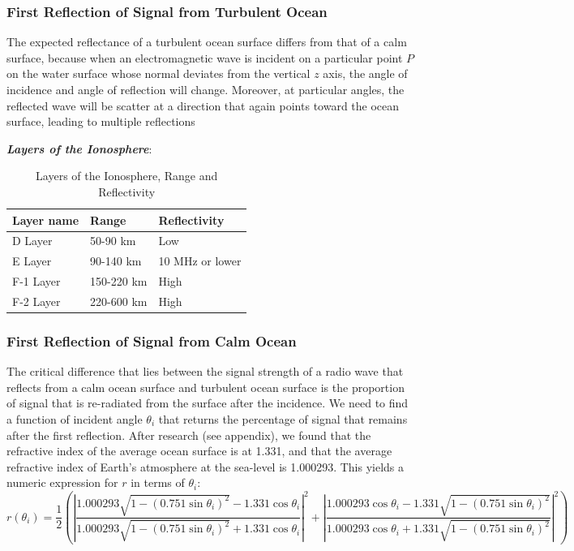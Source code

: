 \documentclass{article}
\begin{document}
\subsubsection{First Reflection of Signal from Turbulent Ocean}

The expected reflectance of a turbulent ocean surface differs from that of a calm surface, because when an electromagnetic wave is incident on a particular point $P$ on the water surface whose normal deviates from the vertical $z$ axis, the angle of incidence and angle of reflection will change. Moreover, at particular angles, the reflected wave will be scatter at a direction that again points toward the ocean surface, leading to multiple reflections 

\textbf{\textit{Layers of the Ionosphere}}:

\begin{table}[htbp]
    \centering
    \begin{tabular}{lll}
        Layer name & Range & Reflectivity \\
        \hline
        D Layer & 50-90 km & Low \\
        E Layer & 90-140 km & 10 MHz or lower \\
        F-1 Layer & 150-220 km & High \\
        F-2 Layer & 220-600 km & High
    \end{tabular}
    \caption{Layers of the Ionosphere, Range and Reflectivity}
    \label{tab:ionosphere_levels}
\end{table}

\subsubsection{First Reflection of Signal from Calm Ocean}

The critical difference that lies between the signal strength of a radio wave that reflects from a calm ocean surface and turbulent ocean surface is the proportion of signal that is re-radiated from the surface after the incidence. We need to find a function of incident angle $\theta_i$ that returns the percentage of signal that remains after the first reflection. After research (see appendix), we found that the refractive index of the average ocean surface is at 1.331, and that the average refractive index of Earth's atmosphere at the sea-level is 1.000293. This yields a numeric expression for $r$ in terms of $\theta_i$:
\begin{equation} \label{eqn:r_total}
    r(\theta_i) = \frac{1}{2}\left(\left|\frac{1.000293 \sqrt{1 - \left(0.751 \sin \theta_i\right)^2} - 1.331 \cos \theta_i}{1.000293 \sqrt{1 - \left(0.751 \sin \theta_i\right)^2} + 1.331 \cos \theta_i}\right|^2 + \left|\frac{1.000293 \cos \theta_i - 1.331 \sqrt{1 - \left(0.751 \sin \theta_i\right)^2}}{1.000293 \cos \theta_i + 1.331 \sqrt{1 - \left(0.751 \sin \theta_i\right)^2}}\right|^2\right)
\end{equation}
\end{document}

